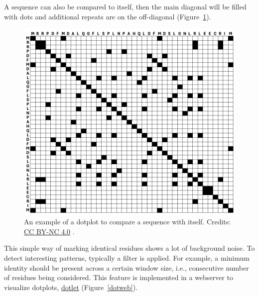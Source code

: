 A sequence can also be compared to itself, then the main diagonal will be filled with dots and additional repeats are on the off-diagonal (Figure~\ref{dotlarge}).

\begin{figure}[!htbp]
\centering
\includegraphics[width=1\linewidth]{files/dot_large-dc5236a779ddd7ca60530ad37c9d5291.png}
\caption[]{An example of a dotplot to compare a sequence with itself. Credits: \href{https://creativecommons.org/licenses/by-nc/4.0/}{CC BY-NC 4.0} \cite{own_2_2024}.}
\label{dotlarge}
\end{figure}

This simple way of marking identical residues shows a lot of background noise.
To detect interesting patterns, typically a filter is applied.
For example, a minimum identity should be present across a certain window size, i.e., consecutive number of residues being considered.
This feature is implemented in a webserver to visualize dotplots, \href{https://dotlet.vital-it.ch/}{dotlet} \cite{dotlet_2000} (Figure~\ref{dotweb}).

